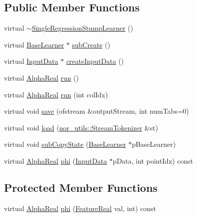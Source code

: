 \subsection*{Public Member Functions}
\begin{DoxyCompactItemize}
\item 
virtual \hyperlink{classMultiBoost_1_1SingleRegressionStumpLearner_a0d2a77f15347599ecdadf866dfd77a65}{$\sim$SingleRegressionStumpLearner} ()
\item 
virtual \hyperlink{classMultiBoost_1_1BaseLearner}{BaseLearner} $\ast$ \hyperlink{classMultiBoost_1_1SingleRegressionStumpLearner_a8260b5663864070910f1b8e014984adc}{subCreate} ()
\item 
virtual \hyperlink{classMultiBoost_1_1InputData}{InputData} $\ast$ \hyperlink{classMultiBoost_1_1SingleRegressionStumpLearner_a1746dfc09faf0d12043c2ade63494b64}{createInputData} ()
\item 
virtual \hyperlink{Defaults_8h_a80184c4fd10ab70a1a17c5f97dcd1563}{AlphaReal} \hyperlink{classMultiBoost_1_1SingleRegressionStumpLearner_ac07bca49a4faeb17605b564fe5bbfd7b}{run} ()
\item 
virtual \hyperlink{Defaults_8h_a80184c4fd10ab70a1a17c5f97dcd1563}{AlphaReal} \hyperlink{classMultiBoost_1_1SingleRegressionStumpLearner_a56a84dffe73852152b7db54579eebdef}{run} (int colIdx)
\item 
virtual void \hyperlink{classMultiBoost_1_1SingleRegressionStumpLearner_a08dc78b056b0f939214637f60e50891d}{save} (ofstream \&outputStream, int numTabs=0)
\item 
virtual void \hyperlink{classMultiBoost_1_1SingleRegressionStumpLearner_a50745d7bcd9da4f3b27be0c4b8a9b472}{load} (\hyperlink{classnor__utils_1_1StreamTokenizer}{nor\_\-utils::StreamTokenizer} \&st)
\item 
virtual void \hyperlink{classMultiBoost_1_1SingleRegressionStumpLearner_af449d15e3389ec33d37613e9684148ba}{subCopyState} (\hyperlink{classMultiBoost_1_1BaseLearner}{BaseLearner} $\ast$pBaseLearner)
\item 
virtual \hyperlink{Defaults_8h_a80184c4fd10ab70a1a17c5f97dcd1563}{AlphaReal} \hyperlink{classMultiBoost_1_1SingleRegressionStumpLearner_a414cce004f466927fb58af8a0a7d6715}{phi} (\hyperlink{classMultiBoost_1_1InputData}{InputData} $\ast$pData, int pointIdx) const 
\end{DoxyCompactItemize}
\subsection*{Protected Member Functions}
\begin{DoxyCompactItemize}
\item 
virtual \hyperlink{Defaults_8h_a80184c4fd10ab70a1a17c5f97dcd1563}{AlphaReal} \hyperlink{classMultiBoost_1_1SingleRegressionStumpLearner_ae38b636f7da351a220efeb4637449743}{phi} (\hyperlink{Defaults_8h_a3a11cfe6a5d469d921716ca6291e934f}{FeatureReal} val, int) const 
\end{DoxyCompactItemize}
